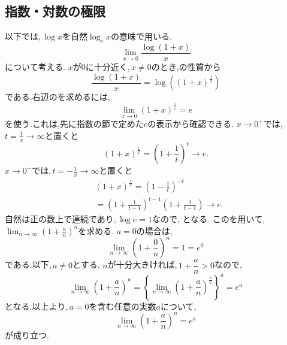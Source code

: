   \subsection{指数・対数の極限}\label{節：自然対数と指数関数の基本極限}
    以下では,\,$\log x$を自然$\log_e x$の意味で用いる.
    \[
      \lim_{x\to0}\frac{\log(1+x)}{x}
    \]
    について考える.
    $x$が$0$に十分近く,\,$x\ne0$のとき,の性質から
    \[
      \frac{\log(1+x)}{x}
      =\log\left((1+x)^\frac{1}{x}\right)
    \]
    である.右辺のを求めるには,
    \[
      \lim_{x\to0}(1+x)^\frac{1}{x}=e
    \]
    を使う.これは,先に指数の節で定めた$e$の表示から確認できる.
    $x\to 0^+$では,\,$\displaystyle t=\frac{1}{x}\to\infty$と置くと
    \[
      (1+x)^\frac{1}{x}=\left(1+\frac1t\right)^t\longrightarrow e.
    \]
    $x\to 0^-$では,\,$\displaystyle t=-\frac{1}{x}\to\infty$と置くと
    \begin{align*}
      &(1+x)^\frac{1}{x}
      =\left(1-\frac1t\right)^{-t}\\
      &=\left(1+\frac1{t-1}\right)^{t-1}
       \left(1+\frac1{t-1}\right)
      \longrightarrow e.
    \end{align*}
    自然は正の数上で連続であり,\,$\log e=1$なので,
\BookMathLayout{\[
      \lim_{x\to0}\frac{\log(1+x)}{x}
      =\lim_{x\to0}\log\left\{(1+x)^\frac{1}{x}\right\}
      =\log e=1
    \]}{
\[
\begin{aligned}
\lim_{x\to0}\frac{\log(1+x)}x
&=\lim_{x\to0}\log\left\{(1+x)^{1/x}\right\}\\
&=\log e=1
\end{aligned}
\]
}
    となる.
    このを用いて,\,$\lim_{n\to\infty}\left(1+\frac{a}{n}\right)^n$を求める.
    $a=0$の場合は,
    \[
      \lim_{n\to\infty}\left(1+\frac{0}{n}\right)^n=1=e^0
    \]
    である.以下,\,$a\ne0$とする.
    $n$が十分大きければ,\,$1+\dfrac{a}{n}>0$なので,
    \[
      \lim_{n\to\infty}\left(1+\frac{a}{n}\right)^n
      =
      \left\{
        \lim_{n\to\infty}
        \left(1+\frac{a}{n}\right)^{\frac{n}{a}}
      \right\}^{a}
      =e^a
    \]
    となる.以上より,\,$a=0$を含む任意の実数$a$について,
    \[
      \lim_{n\to\infty}\left(1+\frac{a}{n}\right)^n=e^a
    \]
    が成り立つ.
